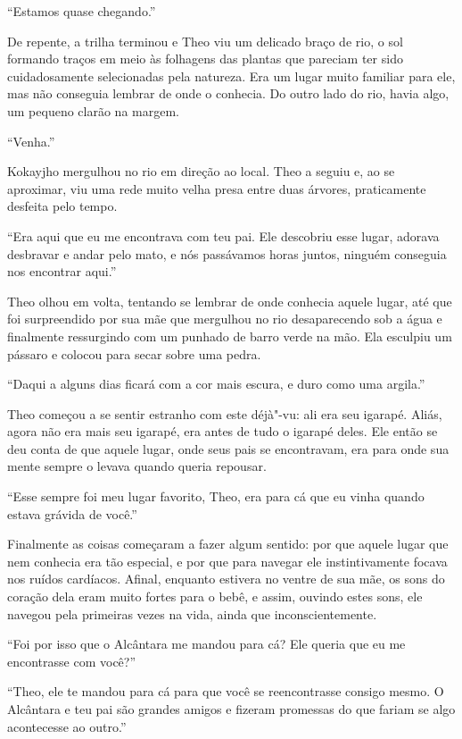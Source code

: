 ``Estamos quase chegando.''

De repente, a trilha terminou e Theo viu um delicado braço de rio, o sol
formando traços em meio às folhagens das plantas que pareciam ter sido
cuidadosamente selecionadas pela natureza. Era um lugar muito familiar
para ele, mas não conseguia lembrar de onde o conhecia. Do outro lado do
rio, havia algo, um pequeno clarão na margem.

``Venha.''

Kokayjho mergulhou no rio em direção ao local. Theo a seguiu e, ao se
aproximar, viu uma rede muito velha presa entre duas árvores,
praticamente desfeita pelo tempo.

``Era aqui que eu me encontrava com teu pai. Ele descobriu esse lugar,
adorava desbravar e andar pelo mato, e nós passávamos horas juntos, ninguém
conseguia nos encontrar aqui.''

Theo olhou em volta, tentando se lembrar de onde conhecia aquele lugar,
até que foi surpreendido por sua mãe que mergulhou no rio desaparecendo
sob a água e finalmente ressurgindo com um punhado de barro verde na mão.
Ela esculpiu um pássaro e colocou para secar sobre uma pedra.

``Daqui a alguns dias ficará com a cor mais escura, e duro como uma
argila.''

Theo começou a se sentir estranho com este déjà"-vu: ali era seu igarapé.
Aliás, agora não era mais seu igarapé, era antes de tudo o igarapé
deles. Ele então se deu conta de que aquele lugar, onde seus pais se
encontravam, era para onde sua mente sempre o levava quando queria
repousar.

``Esse sempre foi meu lugar favorito, Theo, era para cá que eu vinha
quando estava grávida de você.''

Finalmente as coisas começaram a fazer algum sentido: por que aquele
lugar que nem conhecia era tão especial, e por que para navegar ele
instintivamente focava nos ruídos cardíacos. Afinal, enquanto estivera no
ventre de sua mãe, os sons do coração dela eram muito fortes para o bebê,
e assim, ouvindo estes sons, ele navegou pela primeiras vezes na vida,
ainda que inconscientemente.

``Foi por isso que o Alcântara me mandou para cá? Ele queria que eu me
encontrasse com você?''

``Theo, ele te mandou para cá para que você se reencontrasse consigo
mesmo. O Alcântara e teu pai são grandes amigos e fizeram promessas do
que fariam se algo acontecesse ao outro.''

